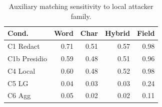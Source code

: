 \begin{table}[t]
\centering
\small
\setlength{\tabcolsep}{3pt}
\caption{Auxiliary matching sensitivity to local attacker family.}
\label{tab:attack_sensitivity}
\begin{tabular}{lrrrr}
\toprule
Cond. & Word & Char & Hybrid & Field \\
\midrule
C1 Redact & 0.71 & 0.51 & 0.57 & 0.98 \\
C1b Presidio & 0.59 & 0.48 & 0.51 & 0.96 \\
C4 Local & 0.60 & 0.48 & 0.52 & 0.98 \\
C5 LG & 0.04 & 0.03 & 0.03 & 0.24 \\
C6 Agg & 0.05 & 0.02 & 0.02 & 0.11 \\
\bottomrule
\end{tabular}
\end{table}
